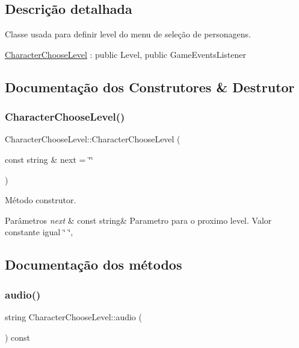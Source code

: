 \subsection{Descrição detalhada}
Classe usada para definir level do menu de seleção de personagens. 

\mbox{\hyperlink{classCharacterChooseLevel}{Character\+Choose\+Level}} \+: public Level, public Game\+Events\+Listener 

\subsection{Documentação dos Construtores \& Destrutor}
\mbox{\label{classCharacterChooseLevel_aa72c1238bc930fd230d13b89f75f5bb3}} 
\subsubsection{\texorpdfstring{Character\+Choose\+Level()}{CharacterChooseLevel()}}
{\footnotesize\ttfamily Character\+Choose\+Level\+::\+Character\+Choose\+Level (\begin{DoxyParamCaption}\item[{const string \&}]{next = {\ttfamily \char`\"{}\char`\"{}} }\end{DoxyParamCaption})}



Método construtor. 


\begin{DoxyParams}{Parâmetros}
{\em next} & const string\& Parametro para o proximo level. Valor constante igual \char`\"{} \char`\"{}, \\
\hline
\end{DoxyParams}


\subsection{Documentação dos métodos}
\mbox{\label{classCharacterChooseLevel_ad46b1c34bad5001f45c0b386ad7fc8e1}} 
\subsubsection{\texorpdfstring{audio()}{audio()}}
{\footnotesize\ttfamily string Character\+Choose\+Level\+::audio (\begin{DoxyParamCaption}{ }\end{DoxyParamCaption}) const}




